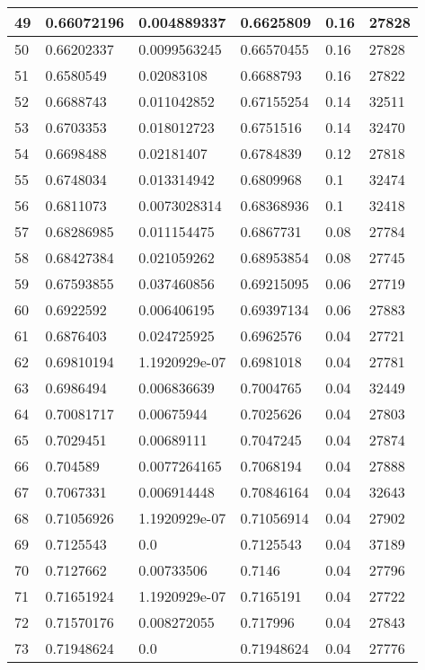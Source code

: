 \begin{longtable}{|l|l|l|l|l|l|}
49 & 0.66072196 & 0.004889337 & 0.6625809 & 0.16 & 27828 \\ \hline 
50 & 0.66202337 & 0.0099563245 & 0.66570455 & 0.16 & 27828 \\ \hline 
51 & 0.6580549 & 0.02083108 & 0.6688793 & 0.16 & 27822 \\ \hline 
52 & 0.6688743 & 0.011042852 & 0.67155254 & 0.14 & 32511 \\ \hline 
53 & 0.6703353 & 0.018012723 & 0.6751516 & 0.14 & 32470 \\ \hline 
54 & 0.6698488 & 0.02181407 & 0.6784839 & 0.12 & 27818 \\ \hline 
55 & 0.6748034 & 0.013314942 & 0.6809968 & 0.1 & 32474 \\ \hline 
56 & 0.6811073 & 0.0073028314 & 0.68368936 & 0.1 & 32418 \\ \hline 
57 & 0.68286985 & 0.011154475 & 0.6867731 & 0.08 & 27784 \\ \hline 
58 & 0.68427384 & 0.021059262 & 0.68953854 & 0.08 & 27745 \\ \hline 
59 & 0.67593855 & 0.037460856 & 0.69215095 & 0.06 & 27719 \\ \hline 
60 & 0.6922592 & 0.006406195 & 0.69397134 & 0.06 & 27883 \\ \hline 
61 & 0.6876403 & 0.024725925 & 0.6962576 & 0.04 & 27721 \\ \hline 
62 & 0.69810194 & 1.1920929e-07 & 0.6981018 & 0.04 & 27781 \\ \hline 
63 & 0.6986494 & 0.006836639 & 0.7004765 & 0.04 & 32449 \\ \hline 
64 & 0.70081717 & 0.00675944 & 0.7025626 & 0.04 & 27803 \\ \hline 
65 & 0.7029451 & 0.00689111 & 0.7047245 & 0.04 & 27874 \\ \hline 
66 & 0.704589 & 0.0077264165 & 0.7068194 & 0.04 & 27888 \\ \hline 
67 & 0.7067331 & 0.006914448 & 0.70846164 & 0.04 & 32643 \\ \hline 
68 & 0.71056926 & 1.1920929e-07 & 0.71056914 & 0.04 & 27902 \\ \hline 
69 & 0.7125543 & 0.0 & 0.7125543 & 0.04 & 37189 \\ \hline 
70 & 0.7127662 & 0.00733506 & 0.7146 & 0.04 & 27796 \\ \hline 
71 & 0.71651924 & 1.1920929e-07 & 0.7165191 & 0.04 & 27722 \\ \hline 
72 & 0.71570176 & 0.008272055 & 0.717996 & 0.04 & 27843 \\ \hline 
73 & 0.71948624 & 0.0 & 0.71948624 & 0.04 & 27776 \\ \hline 

\end{longtable}
